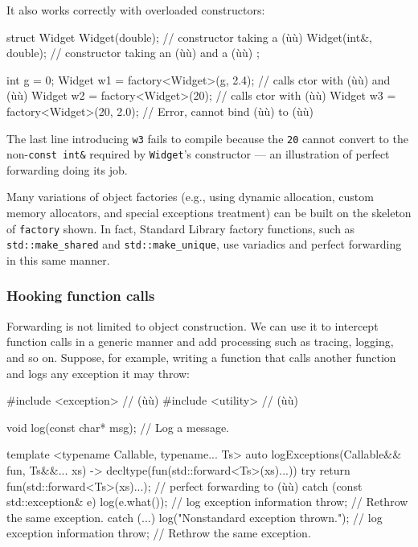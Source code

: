 \noindent It also works correctly with overloaded constructors:

\begin{emcppslisting}[emcppsbatch=e35]
struct Widget
{
    Widget(double);        // constructor taking a (ù{}ù)
    Widget(int&, double);  // constructor taking an (ù{}ù) and a (ù{}ù)
};

int g = 0;
Widget w1 = factory<Widget>(g, 2.4);   // calls ctor with (ù{}ù) and (ù{}ù)
Widget w2 = factory<Widget>(20);       // calls ctor with (ù{}ù)
Widget w3 = factory<Widget>(20, 2.0);  // Error, cannot bind (ù{}ù) to (ù{}ù)
\end{emcppslisting}
    

\noindent The last line introducing \lstinline!w3! fails to compile because the
 \lstinline!20! cannot convert to the
non-\lstinline!const!~\lstinline!int&! required by \lstinline!Widget!'s
constructor --- an illustration of perfect forwarding doing its job.

Many variations of object factories (e.g., using dynamic allocation,
custom memory allocators, and special exceptions treatment) can be built
on the skeleton of \lstinline!factory! shown. In fact, Standard Library
factory functions, such as \lstinline!std::make_shared! and
\lstinline!std::make_unique!, use variadics and perfect forwarding in this
same manner.

\subsubsection[Hooking function calls]{Hooking function calls}\label{hooking-function-calls}

Forwarding is not limited to object construction. We can use it to
intercept function calls in a generic manner and add processing such as
tracing, logging, and so on. Suppose, for example, writing a function
that calls another function and logs any exception it may throw:

\begin{emcppslisting}[emcppsbatch=e36]
#include <exception>  // (ù{}ù)
#include <utility>    // (ù{}ù)

void log(const char* msg);                     // Log a message.

template <typename Callable, typename... Ts>
auto logExceptions(Callable&& fun, Ts&&... xs)
    -> decltype(fun(std::forward<Ts>(xs)...))
{
    try
    {
        return fun(std::forward<Ts>(xs)...);   // perfect forwarding to (ù{}ù)
    }
    catch (const std::exception& e)
    {
        log(e.what());                         // log exception information
        throw;                                 // Rethrow the same exception.
    }
    catch (...)
    {
        log("Nonstandard exception thrown.");  // log exception information
        throw;                                 // Rethrow the same exception.
    }
}
\end{emcppslisting}
    

